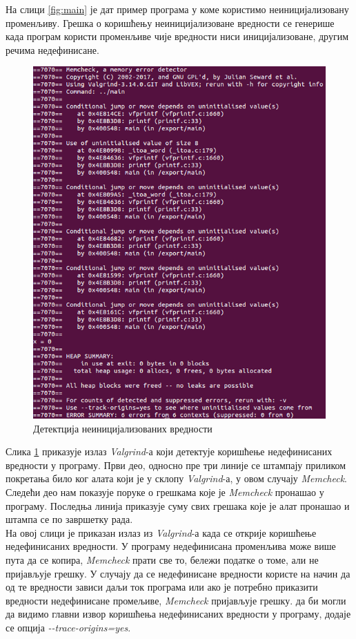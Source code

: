 \documentclass[12pt,oneside]{memoir}
\begin{document}
\indent На слици \ref{fig:main} је дат пример програма у коме користимо неиницијализовану променљиву. Грешка о коришћењу неиницијализоване вредности се генерише када програм користи променљиве чије вредности ниси иницијализоване, другим речима недефинисане.

\begin{figure}[h!]
\begin{center}
\includegraphics[scale=0.75]{slika2.png}
\end{center}
\caption{Детектција неиницијализованих вредности}
\label{fig:memcheck}
\end{figure}

\indent Слика \ref{fig:memcheck} приказује излаз \textit{Valgrind}-а који детектује коришћење недефинисаних вредности у програму. Први део, односно пре три линије се штампају приликом покретања било ког алата који је у склопу \textit{Valgrind}-а, у овом случају \textit{Memcheck}. Следећи део нам показује поруке о грешкама које је \textit{Memcheck} пронашао у програму. Последња линија приказује суму свих грешака које је алат пронашао и штампа се по завршетку рада. \\
\indent На овој слици је приказан излаз из \textit{Valgrind}-а када се открије  коришћење недефинисаних вредности. У програму недефинисана променљива може више пута да се копира, \textit{Memcheck} прати све то, бележи податке о томе, али не пријављује грешку. У случају да се недефинисане вредности користе на начин да од те вредности зависи даљи ток програма или ако је потребно приказити вредности недефинисане промељиве, \textit{Memcheck} пријављује грешку. да би могли да видимо главни извор коришћења недефинисаних вредности у програму, додаје се опција \textit{-\--trace-origins=yes}.
\end{document}
